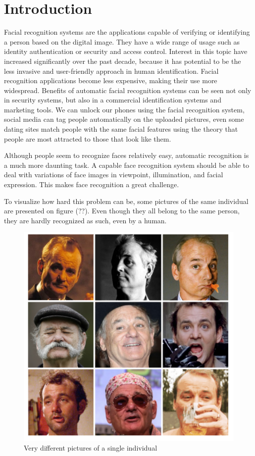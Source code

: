 \chapter{Introduction}
\label{cha:introduction}

Facial recognition systems are the applications capable of verifying or identifying a person based on the digital image. They have a wide range of usage such as identity authentication or security and access control.  Interest in this topic have increased significantly over the past decade, because it has potential to be the less invasive and user-friendly approach in human identification. Facial recognition applications become less expensive, making their use more widespread. Benefits of automatic facial recognition systems can be seen not only in security systems, but also in a commercial identification systems and marketing tools. We can unlock our phones using the facial recognition system, social media can tag people automatically on the uploaded pictures, even some dating sites match people with the same facial features using the theory that people are most attracted to those that look like them.

Although people seem to recognize faces relatively easy, automatic recognition is a much more daunting task. A capable face recognition system should be able to deal with variations of face images in viewpoint, illumination, and facial expression. This makes face recognition a great challenge. 

To visualize how hard this problem can be, some pictures of the same individual are presented on figure (??). Even though they all belong to the same person, they are hardly recognized as such, even by a human.

\begin{figure}[H]
\centering
\includegraphics[scale=0.5]{img/the_same_person.png}
\caption{Very different pictures of a single individual}
\end{figure}


